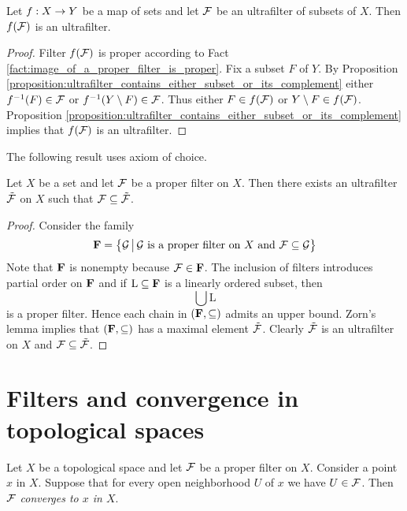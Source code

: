 \begin{corollary}\label{corollary:ultrafilters_are_preserved_by_images}
	Let $f:X\rightarrow Y$ be a map of sets and let ${\mathcal F}$ be an ultrafilter of subsets of $X$. Then $f({\mathcal F})$ is an ultrafilter.
\end{corollary}
\begin{proof}
	Filter $f({\mathcal F})$ is proper according to Fact \ref{fact:image_of_a_proper_filter_is_proper}. Fix a subset $F$ of $Y$. By Proposition \ref{proposition:ultrafilter_contains_either_subset_or_its_complement} either $f^{-1}(F) \in {\mathcal F}$ or $f^{-1}(Y\setminus F) \in {\mathcal F}$. Thus either $F \in f({\mathcal F})$ or $Y\setminus F \in f({\mathcal F})$. Proposition \ref{proposition:ultrafilter_contains_either_subset_or_its_complement} implies that $f({\mathcal F})$ is an ultrafilter.
\end{proof}
\noindent
The following result uses axiom of choice.

\begin{proposition}\label{proposition:existence_of_ultrafilters}
	Let $X$ be a set and let ${\mathcal F}$ be a proper filter on $X$. Then there exists an ultrafilter $\tilde{{\mathcal F}}$ on $X$ such that ${\mathcal F} \subseteq \tilde{{\mathcal F}}$.
\end{proposition}
\begin{proof}
	Consider the family
	$$\mathbf{F} = \big\{{\mathcal G}\,\big|\,{\mathcal G}\mbox{ is a proper filter on }X\mbox{ and }{\mathcal F} \subseteq {\mathcal G}\big\}$$
	Note that $\mathbf{F}$ is nonempty because ${\mathcal F} \in \mathbf{F}$. The inclusion of filters introduces partial order on $\mathbf{F}$ and if $\mathrm{L}\subseteq \mathbf{F}$ is a linearly ordered subset, then
	$$\bigcup \mathrm{L}$$
	is a proper filter. Hence each chain in $\left(\mathbf{F},\subseteq\right)$ admits an upper bound. Zorn's lemma implies that $\left(\mathbf{F},\subseteq\right)$ has a maximal element $\tilde{{\mathcal F}}$. Clearly $\tilde{{\mathcal F}}$ is an ultrafilter on $X$ and ${\mathcal F} \subseteq \tilde{{\mathcal F}}$.
\end{proof}

\section{Filters and convergence in topological spaces}

\begin{definition}
	Let $X$ be a topological space and let ${\mathcal F}$ be a proper filter on $X$. Consider a point $x$ in $X$. Suppose that for every open neighborhood $U$ of $x$ we have $U \in {\mathcal F}$. Then ${\mathcal F}$ \textit{converges to $x$ in $X$}.
\end{definition}

